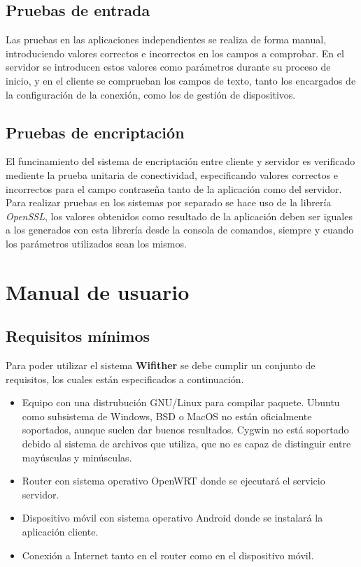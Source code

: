 \documentclass[12pt]{article}
\begin{document}
    \subsection{Pruebas de entrada}
    Las pruebas en las aplicaciones independientes se realiza de forma manual, introduciendo valores correctos e incorrectos en los campos a comprobar. En el servidor se introducen estos valores como parámetros durante su proceso de inicio, y en el cliente se comprueban los campos de texto, tanto los encargados de la configuración de la conexión, como los de gestión de dispositivos.

    \subsection{Pruebas de encriptación}
    El funcinamiento del sistema de encriptación entre cliente y servidor es verificado mediente la prueba unitaria de conectividad, especificando valores correctos e incorrectos para el campo contraseña tanto de la aplicación como del servidor. Para realizar pruebas en los sistemas por separado se hace uso de la librería \textit{OpenSSL}, los valores obtenidos como resultado de la aplicación deben ser iguales a los generados con esta librería desde la consola de comandos, siempre y cuando los parámetros utilizados sean los mismos. 

\section{Manual de usuario}
    \subsection{Requisitos mínimos}
        Para poder utilizar el sistema \textbf{Wifither} se debe cumplir un conjunto de requisitos, los cuales están especificados a continuación.

        \begin{itemize}
            \item Equipo con una distrubución GNU/Linux para compilar paquete. Ubuntu como subsistema de Windows, BSD o MacOS no están oficialmente soportados, aunque suelen dar buenos resultados. Cygwin no está soportado debido al sistema de archivos que utiliza, que no es capaz de distinguir entre mayúsculas y minúsculas.
            \item Router con sistema operativo OpenWRT donde se ejecutará el servicio servidor.
            \item Dispositivo móvil con sistema operativo Android donde se instalará la aplicación cliente.
            \item Conexión a Internet tanto en el router como en el dispositivo móvil.
        \end{itemize}
\end{document}
